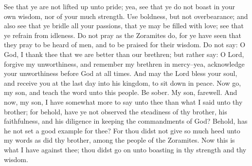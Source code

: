 \bverse \iffalse See that ye are not lifted up unto pride; yea, see that ye do not boast in your own wisdom, nor of your much strength. \fi
See that ye are not lifted up unto pride; yea, see that ye do not boast in your own wisdom, nor of your much strength.
\bverse \iffalse Use boldness, but not overbearance; and also see that ye bridle all your passions, that ye may be filled with love; see that ye refrain from idleness. \fi
Use boldness, but not overbearance; and also see that ye bridle all your passions, that ye may be filled with love; see that ye refrain from idleness.
\bverse \iffalse Do not pray as the Zoramites do, for ye have seen that they pray to be heard of men, and to be praised for their wisdom. \fi
Do not pray as the Zoramites do, for ye have seen that they pray to be heard of men, and to be praised for their wisdom.
\bverse \iffalse Do not say: O God, I thank thee that we are better than our brethren; but rather say: O Lord, forgive my unworthiness, and remember my brethren in mercy--yea, acknowledge your unworthiness before God at all times. \fi
Do not say: O God, I thank thee that we are better than our brethren; but rather say: O Lord, forgive my unworthiness, and remember my brethren in mercy--yea, acknowledge your unworthiness before God at all times.
\bverse \iffalse And may the Lord bless your soul, and receive you at the last day into his kingdom, to sit down in peace. Now go, my son, and teach the word unto this people. Be sober. My son, farewell. \fi
And may the Lord bless your soul, and receive you at the last day into his kingdom, to sit down in peace. Now go, my son, and teach the word unto this people. Be sober. My son, farewell.
\bchapter
\bverse \iffalse And now, my son, I have somewhat more to say unto thee than what I said unto thy brother; for behold, have ye not observed the steadiness of thy brother, his faithfulness, and his diligence in keeping the commandments of God? Behold, has he not set a good example for thee? \fi
And now, my son, I have somewhat more to say unto thee than what I said unto thy brother; for behold, have ye not observed the steadiness of thy brother, his faithfulness, and his diligence in keeping the commandments of God? Behold, has he not set a good example for thee?
\bverse \iffalse For thou didst not give so much heed unto my words as did thy brother, among the people of the Zoramites. Now this is what I have against thee; thou didst go on unto boasting in thy strength and thy wisdom. \fi
For thou didst not give so much heed unto my words as did thy brother, among the people of the Zoramites. Now this is what I have against thee; thou didst go on unto boasting in thy strength and thy wisdom.
